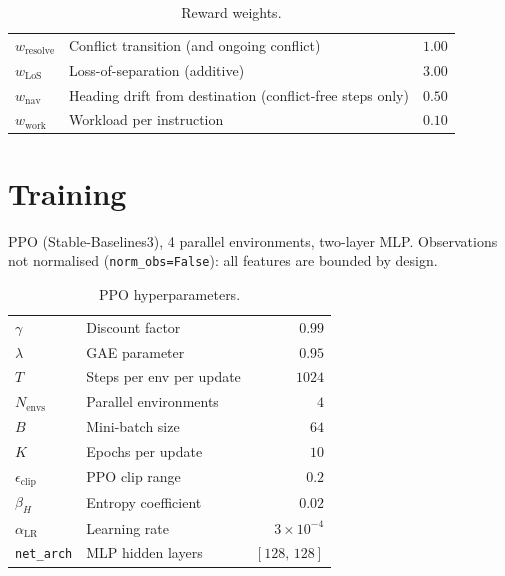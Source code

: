 \documentclass[11pt, a4paper]{article}
\begin{document}
\begin{table}[h]
\centering
\caption{Reward weights.}
\label{tab:weights}
\smallskip
\begin{tabular}{llr}
\toprule
$w_\text{resolve}$ & Conflict transition (and ongoing conflict) & $1.00$ \\
$w_\text{LoS}$     & Loss-of-separation (additive)              & $3.00$ \\
$w_\text{nav}$     & Heading drift from destination (conflict-free steps only) & $0.50$ \\
$w_\text{work}$    & Workload per instruction                    & $0.10$ \\
\bottomrule
\end{tabular}
\end{table}

\section{Training}

PPO (Stable-Baselines3), 4 parallel environments, two-layer MLP.
Observations not normalised (\texttt{norm\_obs=False}): all features are
bounded by design.

\begin{table}[h]
\centering
\caption{PPO hyperparameters.}
\label{tab:hp}
\smallskip
\begin{tabular}{llr}
\toprule
$\gamma$               & Discount factor          & $0.99$ \\
$\lambda$              & GAE parameter            & $0.95$ \\
$T$                    & Steps per env per update & $1024$ \\
$N_\text{envs}$        & Parallel environments    & $4$    \\
$B$                    & Mini-batch size          & $64$   \\
$K$                    & Epochs per update        & $10$   \\
$\epsilon_\text{clip}$ & PPO clip range           & $0.2$  \\
$\beta_H$              & Entropy coefficient      & $0.02$ \\
$\alpha_\text{LR}$     & Learning rate            & $3\times10^{-4}$ \\
\texttt{net\_arch}     & MLP hidden layers        & $[128,\,128]$ \\
\bottomrule
\end{tabular}
\end{table}
\end{document}
